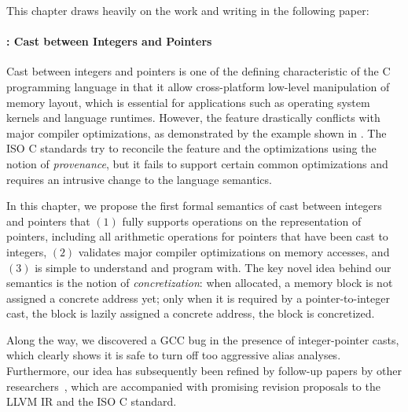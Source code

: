 This chapter draws heavily on the work and writing in the following paper:


\paragraph{: Cast between Integers and Pointers}

Cast between integers and pointers is one of the defining characteristic of the C programming
language in that it allow cross-platform low-level manipulation of memory layout, which is essential
for applications such as operating system kernels and language runtimes.  However, the feature
drastically conflicts with major compiler optimizations, as demonstrated by the example shown in
.  The ISO C standards try to reconcile the feature and the optimizations
using the notion of \emph{provenance}, but it fails to support certain common optimizations and
requires an intrusive change to the language semantics.

In this chapter, we propose the first formal semantics of cast between integers and pointers that
$(1)$ fully supports operations on the representation of pointers, including all arithmetic
operations for pointers that have been cast to integers, $(2)$ validates major compiler
optimizations on memory accesses, and $(3)$ is simple to understand and program with.  The key novel
idea behind our semantics is the notion of \emph{concretization}: when allocated, a memory block is
not assigned a concrete address yet; only when it is required by a pointer-to-integer cast, the
block is lazily assigned a concrete address, \ie{} the block is concretized.

Along the way, we discovered a GCC bug in the presence of integer-pointer casts, which clearly shows
it is safe to turn off too aggressive alias analyses.  Furthermore, our idea has subsequently been
refined by follow-up papers by other researchers~\cite{intptrcast-oopsla,intptrcast-popl}, which are
accompanied with promising revision proposals to the LLVM IR and the ISO C standard.


